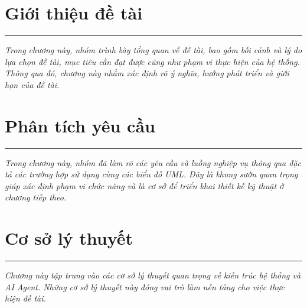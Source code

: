 \documentclass[a4paper]{article}
\theoremstyle{definition}
\begin{document}
\section{Giới thiệu đề tài}
\hrule
\begin{center}
  \begin{minipage}{0.75\textwidth}
    \begin{center}
      \itshape
      Trong chương này, nhóm trình bày tổng quan về đề tài, bao gồm bối cảnh và lý do lựa chọn đề tài, mục tiêu cần đạt được cũng như phạm vi thực hiện của hệ thống. Thông qua đó, chương này nhằm xác định rõ ý nghĩa, hướng phát triển và giới hạn của đề tài.
    \end{center}
  \end{minipage}
\end{center}



\clearpage





\section{Phân tích yêu cầu}
\hrule
\begin{center}
  \begin{minipage}{0.75\textwidth}
    \begin{center}
      \itshape
      Trong chương này, nhóm đã làm rõ các yêu cầu và luồng nghiệp vụ thông qua đặc tả các trường hợp sử dụng cùng các biểu đồ UML. Đây là khung sườn quan trọng giúp xác định phạm vi chức năng và là cơ sở để triển khai thiết kế kỹ thuật ở chương tiếp theo.
    \end{center}
  \end{minipage}
\end{center}







\clearpage





\section{Cơ sở lý thuyết}
\hrule
\begin{center}
  \begin{minipage}{0.75\textwidth}
    \begin{center}
      \itshape
      Chương này tập trung vào các cơ sở lý thuyết quan trọng về kiến trúc hệ thống và AI Agent. Những cơ sở lý thuyết này đóng vai trò làm nền tảng cho việc thực hiện đề tài.
    \end{center}
  \end{minipage}
\end{center}


\clearpage
\end{document}
